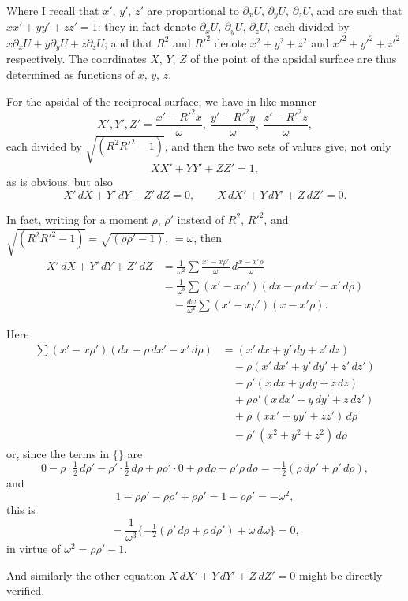 \documentclass[12pt,a4paper]{article}
\theoremstyle{plain}
\begin{document}
Where I recall that $x'$, $y'$, $z'$ are proportional to
$\partial_xU$, $\partial_yU$, $\partial_zU$, and are such that $xx'+yy'+zz'=1$:
they in fact denote $\partial_xU$, $\partial_yU$, $\partial_zU$, each divided by
$x\partial_xU+y\partial_yU+z\partial_zU$; and that $R^2$ and $R'^2$ denote
$x^2+y^2+z^2$ and $x'^2+y'^2+z'^2$ respectively. The coordinates
$X$, $Y$, $Z$ of the point of the apsidal surface are thus determined as
functions of $x$, $y$, $z$.

For the apsidal of the reciprocal surface, we have in like manner
\[
X',Y',Z' = \frac{x'-R'^2x}{\omega},\ \frac{y'-R'^2y}{\omega},\ \frac{z'-R'^2z}{\omega},
\]
each divided by $\sqrt{(R^2R'^2-1)}$,
and then the two sets of values give, not only
\[
XX'+YY'+ZZ'=1,
\]
as is obvious, but also
\[
X'\,dX+Y'\,dY+Z'\,dZ=0,\qquad
X\,dX'+Y\,dY'+Z\,dZ'=0.
\]

In fact, writing for a moment $\rho$, $\rho'$ instead of $R^2$, $R'^2$, and
$\sqrt{(R^2R'^2-1)}=\sqrt{(\rho\rho'-1)}$, $=\omega$, then
\begin{align*}
X'\,dX+Y'\,dY+Z'\,dZ
&= \frac{1}{\omega^2}\sum\frac{x'-x\rho'}{\omega}\,d\frac{x-x'\rho}{\omega}\\
&= \frac{1}{\omega^3}\sum(x'-x\rho')(dx-\rho\,dx'-x'\,d\rho)\\
&\quad -\frac{d\omega}{\omega^4}\sum(x'-x\rho')(x-x'\rho).
\end{align*}

Here
\begin{align*}
\sum(x'-x\rho')(dx-\rho\,dx'-x'\,d\rho)
&= (x'\,dx+y'\,dy+z'\,dz)\\
&\quad -\rho(x'\,dx'+y'\,dy'+z'\,dz')\\
&\quad -\rho'(x\,dx+y\,dy+z\,dz)\\
&\quad +\rho\rho'(x\,dx'+y\,dy'+z\,dz')\\
&\quad +\rho\,(xx'+yy'+zz')\,d\rho\\
&\quad -\rho'\,(x^2+y^2+z^2)\,d\rho
\end{align*}
or, since the terms in $\{\}$ are
\[
0-\rho\cdot\tfrac{1}{2}\,d\rho' - \rho'\cdot\tfrac{1}{2}\,d\rho
+\rho\rho'\cdot 0 + \rho\,d\rho - \rho'\rho\,d\rho
= -\tfrac{1}{2}(\rho\,d\rho'+\rho'\,d\rho),
\]
and
\[
1-\rho\rho'-\rho\rho'+\rho\rho' = 1-\rho\rho' = -\omega^2,
\]
this is
\[
= \frac{1}{\omega^3}\{-\tfrac{1}{2}(\rho'\,d\rho+\rho\,d\rho')+\omega\,d\omega\} = 0,
\]
in virtue of $\omega^2=\rho\rho'-1$.

And similarly the other equation $X\,dX'+Y\,dY'+Z\,dZ'=0$ might
be directly verified.
\end{document}
